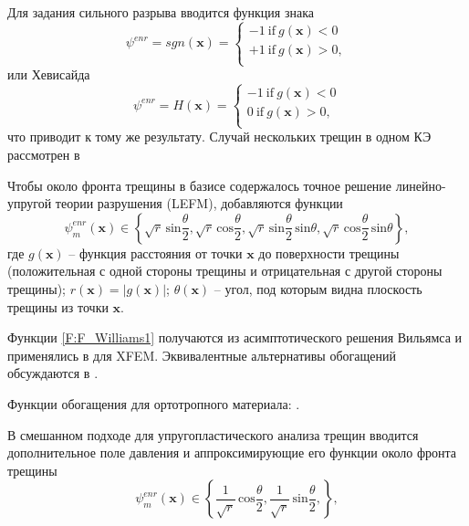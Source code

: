 Для задания сильного разрыва вводится функция знака
\begin{equation}
\psi^{enr}=sgn\left(\mathbf{x}\right)=
\begin{cases}
-1 \: \mathrm{if} \: g\left(\mathbf{x}\right)<0\\
+1 \: \mathrm{if} \: g\left(\mathbf{x}\right)>0,\\
\end{cases}
\label{F:F_Hev}
\end{equation}
или Хевисайда
\begin{equation}
\psi^{enr}=H\left(\mathbf{x}\right)=
\begin{cases}
-1 \: \mathrm{if} \: g\left(\mathbf{x}\right)<0\\
0 \: \mathrm{if} \: g\left(\mathbf{x}\right)>0,\\
\end{cases}
\label{F:F_Hev2}
\end{equation}
что приводит к тому же результату. Случай нескольких трещин в одном КЭ рассмотрен в \cite{Moes2013,Moes2016,Moes2017,Paul2018}

Чтобы около фронта трещины в базисе содержалось точное решение линейно-упругой теории разрушения (LEFM), добавляются функции
\begin{equation}
\psi_m^{enr}\left(\mathbf{x}\right)\in\left\lbrace
\sqrt{r}\,\mathrm{sin}\frac{\theta}{2},
\sqrt{r}\,\mathrm{cos}\frac{\theta}{2},
\sqrt{r}\,\mathrm{sin}\frac{\theta}{2}\,\mathrm{sin}\theta,
\sqrt{r}\,\mathrm{cos}\frac{\theta}{2}\,\mathrm{sin}\theta\right\rbrace,
\label{F:F_Williams1}
\end{equation}
где $g\left(\mathbf{x}\right)$ -- функция расстояния от точки $\mathbf{x}$ до поверхности трещины (положительная с одной стороны трещины и отрицательная с другой стороны трещины); $r\left(\mathbf{x}\right)=\left| g\left(\mathbf{x}\right)\right|$; $\theta\left(\mathbf{x}\right)$ -- угол, под которым видна плоскость трещины из точки $\mathbf{x}$.

Функции \eqref{F:F_Williams1} получаются из асимптотического решения Вильямса \cite{Williams1961} и применялись в \cite{Belytschko1999} для XFEM. Эквивалентные альтернативы обогащений обсуждаются в \cite{Gupta2013,Gupta2015_sgfem}.

Функции обогащения для ортотропного материала: \cite{Asadpoure2007,Hattori2012}.

В смешанном подходе для упругопластического анализа трещин \cite{Feulvarch2020} вводится дополнительное поле давления и аппроксимирующие его функции около фронта трещины \cite{Westergaard1939}
\begin{equation}
\psi_m^{enr}\left(\mathbf{x}\right)\in\left\lbrace
\frac{1}{\sqrt{r}}\,\mathrm{cos}\frac{\theta}{2},
\frac{1}{\sqrt{r}}\,\mathrm{sin}\frac{\theta}{2},
\right\rbrace,
\label{F:F_Westergaard}
\end{equation}

